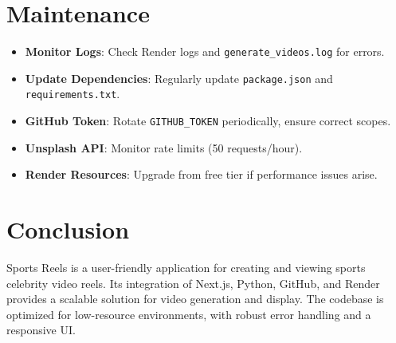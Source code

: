 \documentclass[a4paper,12pt]{article}
\begin{document}
\section{Maintenance}
\begin{itemize}
    \item \textbf{Monitor Logs}: Check Render logs and \texttt{generate\_videos.log} for errors.
    \item \textbf{Update Dependencies}: Regularly update \texttt{package.json} and \texttt{requirements.txt}.
    \item \textbf{GitHub Token}: Rotate \texttt{GITHUB\_TOKEN} periodically, ensure correct scopes.
    \item \textbf{Unsplash API}: Monitor rate limits (50 requests/hour).
    \item \textbf{Render Resources}: Upgrade from free tier if performance issues arise.
\end{itemize}

\section{Conclusion}
Sports Reels is a user-friendly application for creating and viewing sports celebrity video reels. Its integration of Next.js, Python, GitHub, and Render provides a scalable solution for video generation and display. The codebase is optimized for low-resource environments, with robust error handling and a responsive UI.
\end{document}
